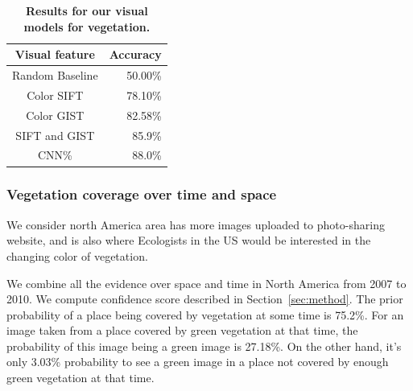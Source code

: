
\begin{table}\centering
{}
\caption {\textbf{Results for our  visual models for vegetation.}}
\label{tab:veg_img_classifier} 
\begin{tabular}{@{}cr@{}}\toprule
Visual feature &  Accuracy\\\midrule
Random Baseline & 50.00\%\\
Color SIFT & 78.10\%\\
Color GIST & 82.58\% \\
SIFT and GIST& 85.9\% \\
CNN\% &  88.0\%\\
\bottomrule
\end{tabular}
\end{table}


\subsubsection{Vegetation coverage over time and space}
We consider north America area has more images uploaded to photo-sharing website, and is also where Ecologists in the US would be interested in the changing color of vegetation. 


We combine all the evidence over space and time in North America from 2007 to 2010. We compute confidence score described in Section~\ref{sec:method}. 
The prior probability of a place being covered by vegetation at some time is 75.2\%.
For an image taken from a place covered by green vegetation at that time, the probability of this image being a green image is 27.18\%. On the other hand, it's only 3.03\% probability to see a green image in a place not covered by enough green vegetation at that time.

